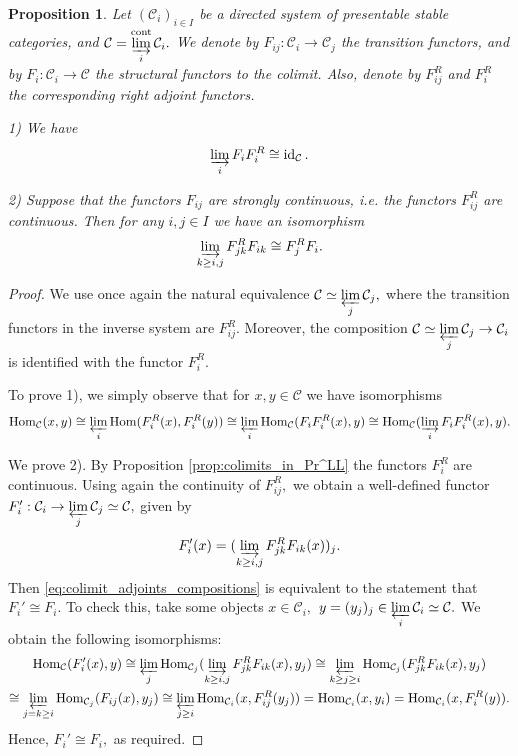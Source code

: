 \documentclass[11pt,leqno]{amsart}
\newtheorem{prop}[theo]{Proposition}
\numberwithin{equation}{section}
\def\Hom{\operatorname{Hom}}
\newcommand{\indlim}[1][]{\mathop{\varinjlim}\limits_{#1}}
\newcommand{\prolim}[1][]{\mathop{\varprojlim}\limits_{#1}}
\newcommand{\cont}{\operatorname{cont}}
\newcommand{\cC}{{\mathcal C}}
\newcommand{\id}{\operatorname{id}}
\begin{document}
\begin{prop}\label{prop:colimit_of_presentable_compositions_of_adjoints} Let $(\cC_i)_{i\in I}$ be a directed system of presentable stable categories, and $\cC=\indlim[i]^{\cont}\cC_i.$ We denote by $F_{ij}:\cC_i\to\cC_j$ the transition functors, and by $F_i:\cC_i\to \cC$ the structural functors to the colimit. Also, denote by $F_{ij}^R$ and $F_i^R$ the corresponding right adjoint functors.

1) We have $$\indlim[i] F_i F_i^R\cong \id_{\cC}.$$

2) Suppose that the functors $F_{ij}$ are strongly continuous, i.e. the functors $F_{ij}^R$ are continuous. Then for any $i,j\in I$ we have an isomorphism
\begin{equation}\label{eq:colimit_adjoints_compositions} \indlim[k\geq i,j] F_{jk}^R F_{ik}\cong F_j^R F_i.\end{equation}\end{prop}

\begin{proof}We use once again the natural equivalence
$\cC\simeq \prolim[j]\cC_j,$
where the transition functors in the inverse system are $F_{ij}^R.$ Moreover, the composition $\cC\simeq \prolim[j]\cC_j\to\cC_i$ is identified with the functor $F_i^R.$

To prove 1), we simply observe that for $x,y\in\cC$ we have isomorphisms
$$\Hom_{\cC}(x,y)\cong \prolim[i]\Hom(F_i^R(x),F_i^R(y))\cong\prolim[i] \Hom_{\cC}(F_i F_i^R(x),y)\cong\Hom_{\cC}(\indlim[i] F_i F_i^R(x),y).$$

We prove 2). By Proposition \ref{prop:colimits_in_Pr^LL} the functors $F_i^R$ are continuous. Using again the continuity of $F_{ij}^R,$ we obtain a well-defined functor $F_i':\cC_i\to\prolim[j]\cC_j\simeq \cC,$ given by
$$F_i'(x)=(\indlim[k\geq i,j]F_{jk}^R F_{ik}(x))_j.$$ Then \eqref{eq:colimit_adjoints_compositions} is equivalent to the statement that $F_i'\cong F_i.$ To check this, take some objects $x\in\cC_i,$ $y=(y_j)_j\in\prolim[i]\cC_i\simeq \cC.$ We obtain the following isomorphisms:
\begin{multline*}\Hom_{\cC}(F_i'(x),y)\cong\prolim[j]\Hom_{\cC_j}(\indlim[k\geq i,j]F_{jk}^R F_{ik}(x),y_j)\cong \prolim[k\geq j\geq i]\Hom_{\cC_j}(F_{jk}^R F_{ik}(x),y_j)\\ \cong
\prolim[j=k\geq i]\Hom_{\cC_j}(F_{ij}(x),y_j)\cong\prolim[j\geq i]\Hom_{\cC_i}(x,F_{ij}^R(y_j))=\Hom_{\cC_i}(x,y_i)=\Hom_{\cC_i}(x,F_i^R(y)).\end{multline*}
Hence, $F_i'\cong F_i,$ as required.\end{proof} 
\end{document}
